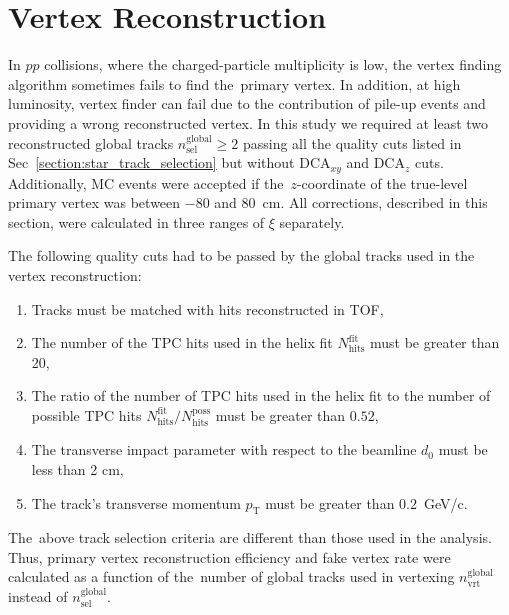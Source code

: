 \section{Vertex Reconstruction}\label{section:star_vertex}

In $pp$ collisions, where the charged-particle multiplicity is low, the vertex finding algorithm sometimes fails to find the~primary vertex. In addition, at high luminosity, vertex finder can fail due to the contribution of pile-up events and providing a wrong reconstructed vertex. In this study we required at least two reconstructed global tracks $n^\textrm{global}_\textrm{sel}\geq 2$ passing all the quality cuts listed in Sec~\ref{section:star_track_selection} but without $\textrm{DCA}_{xy}$ and $\textrm{DCA}_{z}$ cuts.  Additionally, MC events were accepted if the~$z$-coordinate of the true-level primary vertex was between $-80$ and $80$~cm. All corrections, described in this section, were calculated in three ranges of $\xi$ separately.

The following quality cuts had to be passed by the global tracks used in the vertex reconstruction:
\begin{enumerate}
	\item Tracks must be matched with hits reconstructed in TOF,
	\item The number of the TPC hits used in the helix fit $N_\textrm{hits}^\textrm{fit}$ must be greater than 20,
	\item The ratio of the number of TPC hits used in the helix fit to the number of possible TPC hits $N_\textrm{hits}^\textrm{fit}/N_\textrm{hits}^\textrm{poss}$ must be greater than $0.52$,
	\item The transverse impact parameter with respect to the beamline $d_0$ must be less than 2 cm,
	\item The track's transverse momentum $p_\textrm{T}$ must be greater than $0.2$~GeV/c.
\end{enumerate}
 The~above track selection criteria are different than those used in the analysis. Thus, primary vertex reconstruction efficiency and fake vertex rate were calculated as a function of the~number of global tracks used in vertexing $n^\textrm{global}_\textrm{vrt}$ instead of $n^\textrm{global}_\textrm{sel}$. 

